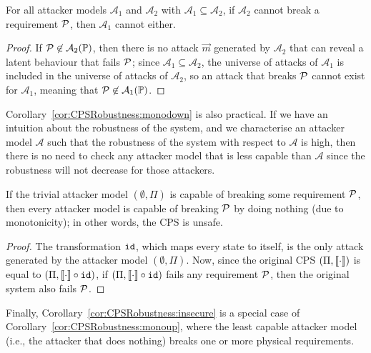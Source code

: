{{\begin{corollary}
  \label{cor:CPSRobustness:monodown}
  For all attacker models $\mathcal{A}_1$ and $\mathcal{A}_2$ with $\mathcal{A}_1\subseteq \mathcal{A}_2$, if $\mathcal{A}_2$ cannot break a requirement $\mathcal{P}$, then $\mathcal{A}_1$ cannot either.
  \end{corollary}
  \begin{proof}
  If $\mathcal{P}\not\in\mathcal{A}_2(\mathbb{P})$, then there is no attack $\vec{m}$ generated by $\mathcal{A}_2$ that can reveal a latent behaviour that fails $\mathcal{P}$; since $\mathcal{A}_1\subseteq \mathcal{A}_2$, the universe of attacks of $\mathcal{A}_1$ is included in the universe of attacks of $\mathcal{A}_2$, so an attack that breaks $\mathcal{P}$ cannot exist for $\mathcal{A}_1$, meaning that $\mathcal{P}\not\in\mathcal{A}_1(\mathbb{P})$.
  \end{proof}
  Corollary~\ref{cor:CPSRobustness:monodown} is also practical. If we have an intuition about the robustness of the system, and we characterise an attacker model $\mathcal{A}$ such that the robustness of the system with respect to $\mathcal{A}$ is high, then there is no need to check any attacker model that is less capable than $\mathcal{A}$ since the robustness will not decrease for those attackers.%

\begin{corollary}
  \label{cor:CPSRobustness:insecure}
  If the trivial attacker model $(\emptyset,\Pi)$ is capable of breaking some requirement $\mathcal{P}$, then every attacker model is capable of breaking $\mathcal{P}$ by doing nothing (due to monotonicity); in other words, the CPS is unsafe.
\end{corollary}
\begin{proof}
  The transformation ${\texttt{id}}$, which maps every state to itself, is the only attack generated by the attacker model $(\emptyset,\Pi)$. Now, since the original CPS $(\Pi,{{{\llbracket\cdot\rrbracket}}})$ is equal to $(\Pi,{{{\llbracket\cdot\rrbracket}}}\circ {\texttt{id}})$, if $(\Pi,{{{\llbracket\cdot\rrbracket}}}\circ {\texttt{id}})$ fails any requirement $\mathcal{P}$, then the original system also fails $\mathcal{P}$. %
\end{proof}
Finally, Corollary~\ref{cor:CPSRobustness:insecure} is a special case of Corollary~\ref{cor:CPSRobustness:monoup}, where the least capable attacker model (i.e., the attacker that does nothing) breaks one or more physical requirements. %
 
}}
